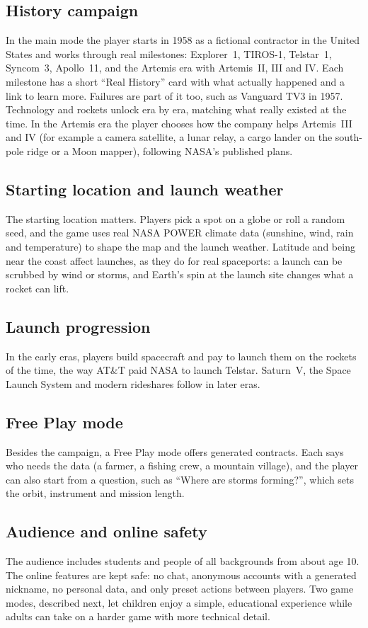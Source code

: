 \documentclass[11pt,a4paper]{article}
\begin{document}
\subsection{History campaign}
In the main mode the player starts in 1958 as a fictional contractor in the United States and works through real
milestones: Explorer~1, TIROS-1, Telstar~1, Syncom~3, Apollo~11, and the Artemis era with Artemis~II, III and IV.
Each milestone has a short ``Real History'' card with what actually happened and a link to learn more. Failures are
part of it too, such as Vanguard TV3 in 1957. Technology and rockets unlock era by era, matching what really existed
at the time. In the Artemis era the player chooses how the company helps Artemis~III and IV (for example a camera
satellite, a lunar relay, a cargo lander on the south-pole ridge or a Moon mapper), following NASA's published plans.

\subsection{Starting location and launch weather}
The starting location matters. Players pick a spot on a globe or roll a random seed, and the game uses real NASA
POWER climate data (sunshine, wind, rain and temperature) to shape the map and the launch weather. Latitude and
being near the coast affect launches, as they do for real spaceports: a launch can be scrubbed by wind or storms, and
Earth's spin at the launch site changes what a rocket can lift.

\subsection{Launch progression}
In the early eras, players build spacecraft and pay to launch them on the rockets of the time, the way AT\&T paid
NASA to launch Telstar. Saturn~V, the Space Launch System and modern rideshares follow in later eras.

\subsection{Free Play mode}
Besides the campaign, a Free Play mode offers generated contracts. Each says who needs the data (a farmer, a
fishing crew, a mountain village), and the player can also start from a question, such as ``Where are storms
forming?'', which sets the orbit, instrument and mission length.

\subsection{Audience and online safety}
The audience includes students and people of all backgrounds from about age 10. The online features are kept safe:
no chat, anonymous accounts with a generated nickname, no personal data, and only preset actions between players.
Two game modes, described next, let children enjoy a simple, educational experience while adults can take on a
harder game with more technical detail.
\end{document}
